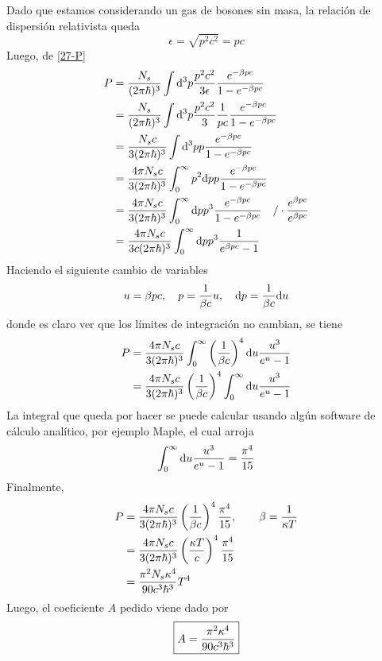 \begin{sol}
%
Dado que estamos considerando un gas de bosones sin masa, la relación de dispersión relativista queda
\begin{equation}
  \epsilon=\sqrt{p^2c^2}=pc
\end{equation}
Luego, de \eqref{27-P}
\begin{align}
  P&=\frac{N_s}{(2\pi\hbar)^3}\int\dd^3p\frac{p^2c^2}{3\epsilon}\frac{e^{-\beta pc}}{1-e^{-\beta pc}}\\
  &=\frac{N_s}{(2\pi\hbar)^3}\int\dd^3p\frac{p^2c^2}{3}\frac{1}{pc}\frac{e^{-\beta pc}}{1-e^{-\beta pc}}\\
  &=\frac{N_sc}{3(2\pi\hbar)^3}\int\dd^3p p\frac{e^{-\beta pc}}{1-e^{-\beta pc}}\\
  &=\frac{4\pi N_sc}{3(2\pi\hbar)^3}\int_0^\infty p^2\dd p p\frac{e^{-\beta pc}}{1-e^{-\beta pc}}\\
  &=\frac{4\pi N_sc}{3(2\pi\hbar)^3}\int_0^\infty \dd pp^3\frac{e^{-\beta pc}}{1-e^{-\beta pc}}\quad /\cdot\frac{e^{\beta pc}}{e^{\beta pc}}\label{mult-ee}\\
  &=\frac{4\pi N_sc}{3c(2\pi\hbar)^3}\int_0^\infty \dd pp^3\frac{1}{e^{\beta pc}-1}
\end{align}
Haciendo el siguiente cambio de variables
\begin{equation}\label{27-cambio-varable}
  u=\beta pc,\quad p=\frac{1}{\beta c}u ,\quad  \dd p =\frac{1}{\beta c}\dd u
\end{equation}
donde es claro ver que los límites de integración no cambian, se tiene
\begin{align}
  P&=\frac{4\pi N_sc}{3(2\pi\hbar)^3}\int_0^\infty \left(\frac{1}{\beta c}\right)^4\dd u\frac{u^3}{e^{u}-1}\\
  &=\frac{4\pi N_sc}{3(2\pi\hbar)^3}\left(\frac{1}{\beta c}\right)^4\int_0^\infty \dd u\frac{u^3}{e^{u}-1}
\end{align}
La integral que queda por hacer se puede calcular usando algún software de cálculo analítico, por ejemplo Maple, el cual arroja
\begin{equation}\label{27-integral}
  \int_0^\infty \dd u\frac{u^3}{e^{u}-1}=\frac{\pi^4}{15}
\end{equation}
Finalmente,
\begin{align}
  P &=\frac{4\pi N_sc}{3(2\pi\hbar)^3}\left(\frac{1}{\beta c}\right)^4\frac{\pi^4}{15},\qquad \beta=\frac{1}{\kappa T}\\
  &=\frac{4\pi N_sc}{3(2\pi\hbar)^3}\left(\frac{\kappa T}{c}\right)^4\frac{\pi^4}{15}\\
  &=\frac{\pi^2N_s\kappa^4}{90c^3\hbar^3}T^4
\end{align}
Luego, el coeficiente $A$ pedido viene dado por
\begin{equation}
\boxed{  A=\frac{\pi^2\kappa^4}{90c^3\hbar^3}}
\end{equation}


\end{sol}
